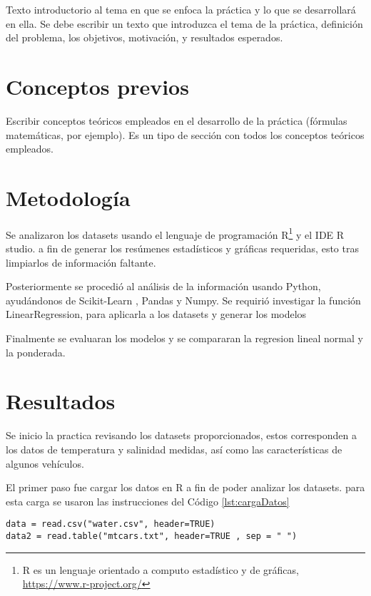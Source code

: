 \documentclass[sigconf]{acmart}
\begin{document}
Texto introductorio al tema en que se enfoca la pr{\'a}ctica y lo que se desarrollar{\'a} en ella. Se debe escribir un texto que introduzca el tema de la 
pr{\'a}ctica, definici{\'o}n del problema, los objetivos, motivaci{\'o}n,  y resultados esperados.

\section{Conceptos previos}

Escribir conceptos te{\'o}ricos empleados en el desarrollo de la pr{\'a}ctica (f{\'o}rmulas matem{\'a}ticas, por ejemplo). Es un tipo de secci{\'o}n con todos los conceptos te{\'o}ricos empleados.

\section{Metodología}

Se analizaron los datasets usando el lenguaje de programación R\footnote{R es un lenguaje orientado a computo estadístico y de gráficas, \url{https://www.r-project.org/} } y el IDE R studio. a fin de generar los resúmenes estadísticos y gráficas requeridas, esto tras limpiarlos de información faltante.

Posteriormente se procedió al análisis de la información usando Python, ayudándonos de Scikit-Learn , Pandas y Numpy.
Se requirió investigar la función LinearRegression, para aplicarla a los datasets y generar los modelos

Finalmente se evaluaran los modelos y se compararan la regresion lineal normal y la ponderada.

\section{Resultados}

Se inicio la practica revisando los datasets proporcionados, estos corresponden a los datos de temperatura y salinidad medidas, así como las características de algunos vehículos. 

El primer paso fue cargar los datos en R a fin de poder analizar los datasets. para esta carga se usaron las instrucciones del Código \ref{lst:cargaDatos}

\begin{lstlisting}[caption=lectura de los datos,breaklines,label=lst:cargaDatos]
data = read.csv("water.csv", header=TRUE)
data2 = read.table("mtcars.txt", header=TRUE , sep = " ")
\end{lstlisting}
\end{document}
